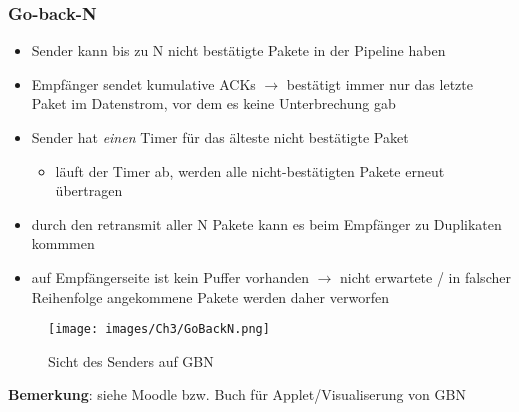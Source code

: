 \subsubsection{Go-back-N}
\begin{itemize}
    \item Sender kann bis zu N nicht bestätigte Pakete in der Pipeline haben
    \item Empfänger sendet kumulative ACKs $\rightarrow$ bestätigt immer nur das letzte Paket im Datenstrom, vor dem es keine Unterbrechung gab
    \item Sender hat \emph{einen} Timer für das älteste nicht bestätigte Paket
            \begin{itemize}
                \item läuft der Timer ab, werden alle nicht-bestätigten Pakete erneut übertragen
            \end{itemize}
    \item durch den retransmit aller N Pakete kann es beim Empfänger zu Duplikaten kommmen  
    \item auf Empfängerseite ist kein Puffer vorhanden $\rightarrow$ nicht erwartete / in falscher Reihenfolge angekommene Pakete werden daher verworfen
\end{itemize}


\begin{figure}[H]
    \centering
    \texttt{[image: images/Ch3/GoBackN.png]}
    \caption{Sicht des Senders auf GBN}
    \label{Ch03-GBN}
\end{figure}

\noindent \textbf{Bemerkung}: siehe Moodle bzw. Buch für Applet/Visualiserung von GBN

